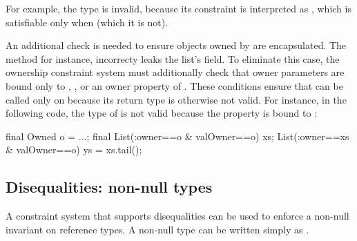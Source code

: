 For example, the type 
is invalid, because
its constraint is interpreted as
,
which is satisfiable only when  (which it is not).

An additional check is needed to ensure objects owned by
 are encapsulated.
The  method for instance, incorrecty leaks the
list's  field.  To eliminate this case, the ownership
constraint system must additionally check that owner parameters
are bound only to 
, , or an owner property of .
These conditions ensure that  can be called only on
 because its return type is otherwise not valid.
For instance, in the following code, the type of  is
not valid because the  property is bound to :
\begin{displayxten}
    final Owned o = ...;
    final List(:owner==o & valOwner==o) xs;
    List(:owner==xs & valOwner==o) ys = xs.tail();
\end{displayxten}

\subsection{Disequalities: non-null types}

A constraint system that supports disequalities can be used to
enforce a non-null invariant on reference types.
A non-null type  can be written simply as .

